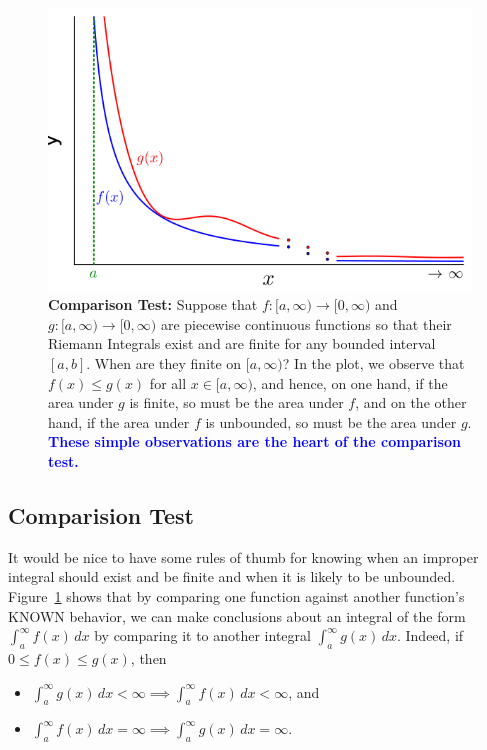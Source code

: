 \begin{figure}[ht]%
\centering    
\includegraphics[width=0.6\columnwidth]{graphics/Chap08/ComparisonTest.png}%
    \caption[]{\textbf{Comparison Test:} Suppose that $f:[a, \infty) \to [0, \infty)$ and $g:[a, \infty) \to [0, \infty)$ are piecewise continuous functions so that their Riemann Integrals exist and are finite for any bounded interval $[a, b]$. When are they finite on $[a, \infty)$? In the plot, we observe that $f(x) \le g(x)$ for all $x \in [a, \infty)$, and hence, on one hand, if the area under $g$ is finite, so must be the area under $f$, and on the other hand, if the area under $f$ is unbounded, so must be the area under $g$. \textcolor{blue}{\bf These simple observations are the heart of the comparison test.}}
    \label{fig:ComparisionTest}
\end{figure}


\bigskip

\subsection{Comparision Test}
\label{sec:ComparisonTest}
 It would be nice to have some rules of thumb for knowing when an improper integral should exist and be finite and when it is likely to be unbounded. Figure~\ref{fig:ComparisionTest} shows that by comparing one function against another function's KNOWN behavior, we can make conclusions about an integral of the form $\int_a^\infty f(x) \, dx$ by comparing it to another integral $\int_a^\infty g(x) \, dx$. Indeed, if $0\le f(x) \le g(x)$, then 
 \begin{itemize}
     \item $\int_a^\infty g(x) \, dx < \infty \implies \int_a^\infty f(x) \, dx < \infty $, and 
     \item $\int_a^\infty f(x) \, dx =\infty \implies \int_a^\infty g(x) \, dx = \infty $. 
 \end{itemize}
 
